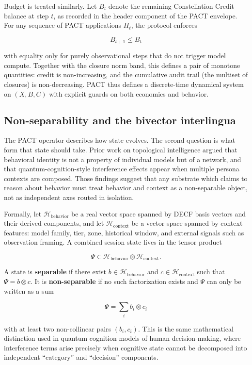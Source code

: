 \documentclass{article}
\begin{document}
Budget is treated similarly. Let \(B_t\) denote the remaining
Constellation Credit balance at step \(t\), as recorded in the header
component of the PACT envelope. For any sequence of PACT applications
\(\Pi_t\), the protocol enforces

\[
B_{t+1} \le B_t
\]

with equality only for purely observational steps that do not trigger
model compute. Together with the closure norm band, this defines a pair
of monotone quantities: credit is non-increasing, and the cumulative
audit trail (the multiset of closures) is non-decreasing. PACT thus
defines a discrete-time dynamical system on \((X, B, C)\) with explicit
guards on both economics and behavior.

\subsection{Non-separability and the bivector
interlingua}\label{non-separability-and-the-bivector-interlingua}

The PACT operator describes how state evolves. The second question is
what form that state should take. Prior work on topological intelligence
argued that behavioral identity is not a property of individual models
but of a network, and that quantum-cognition-style interference effects
appear when multiple persona contexts are composed. Those findings
suggest that any substrate which claims to reason about behavior must
treat behavior and context as a non-separable object, not as independent
axes routed in isolation.

Formally, let \(\mathcal{H}_{\text{behavior}}\) be a real vector space
spanned by DECF basis vectors and their derived components, and let
\(\mathcal{H}_{\text{context}}\) be a vector space spanned by context
features: model family, tier, zone, historical window, and external
signals such as observation framing. A combined session state lives in
the tensor product

\[
\Psi \in \mathcal{H}_{\text{behavior}} \otimes \mathcal{H}_{\text{context}}.
\]

A state is \textbf{separable} if there exist
\(b \in \mathcal{H}_{\text{behavior}}\) and
\(c \in \mathcal{H}_{\text{context}}\) such that \(\Psi = b \otimes c\).
It is \textbf{non-separable} if no such factorization exists and
\(\Psi\) can only be written as a sum

\[
\Psi = \sum_{i} b_i \otimes c_i
\]

with at least two non-collinear pairs \((b_i, c_i)\). This is the same
mathematical distinction used in quantum cognition models of human
decision-making, where interference terms arise precisely when cognitive
state cannot be decomposed into independent ``category'' and
``decision'' components.
\end{document}
